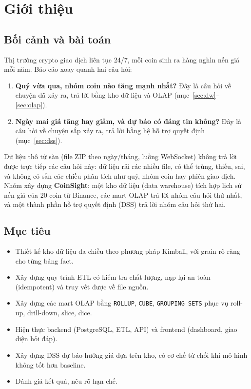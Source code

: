 \documentclass[11pt,a4paper]{article}
\newcommand{\code}[1]{\texttt{#1}}
\begin{document}
\tableofcontents
\newpage

\section{Giới thiệu}

\subsection{Bối cảnh và bài toán}
Thị trường crypto giao dịch liên tục 24/7, mỗi coin sinh ra hàng nghìn nến giá mỗi năm.
Báo cáo xoay quanh hai câu hỏi:
\begin{enumerate}
  \item \textbf{Quý vừa qua, nhóm coin nào tăng mạnh nhất?} Đây là câu hỏi về chuyện đã xảy ra,
    trả lời bằng kho dữ liệu và OLAP (mục~\ref{sec:dw}--\ref{sec:olap}).
  \item \textbf{Ngày mai giá tăng hay giảm, và dự báo có đáng tin không?} Đây là câu hỏi về chuyện
    sắp xảy ra, trả lời bằng hệ hỗ trợ quyết định (mục~\ref{sec:dss}).
\end{enumerate}

Dữ liệu thô từ sàn (file ZIP theo ngày/tháng, luồng WebSocket) không trả lời được trực tiếp
các câu hỏi này: dữ liệu rải rác nhiều file, có thể trùng, thiếu, sai, và không có sẵn
các chiều phân tích như quý, nhóm coin hay phiên giao dịch. Nhóm xây dựng \textbf{CoinSight}:
một kho dữ liệu (data warehouse) tích hợp lịch sử nến giá của 20 coin từ Binance, các
mart OLAP trả lời nhóm câu hỏi thứ nhất, và một thành phần hỗ trợ quyết định (DSS) trả
lời nhóm câu hỏi thứ hai.

\subsection{Mục tiêu}
\begin{itemize}
  \item Thiết kế kho dữ liệu đa chiều theo phương pháp Kimball, với grain rõ ràng cho từng bảng fact.
  \item Xây dựng quy trình ETL có kiểm tra chất lượng, nạp lại an toàn (idempotent) và truy vết được về file nguồn.
  \item Xây dựng các mart OLAP bằng \code{ROLLUP}, \code{CUBE}, \code{GROUPING SETS} phục vụ roll-up, drill-down, slice, dice.
  \item Hiện thực backend (PostgreSQL, ETL, API) và frontend (dashboard, giao diện hỏi đáp).
  \item Xây dựng DSS dự báo hướng giá dựa trên kho, có cơ chế từ chối khi mô hình không tốt hơn baseline.
  \item Đánh giá kết quả, nêu rõ hạn chế.
\end{itemize}
\end{document}
